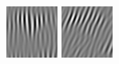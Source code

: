 \begin{figure}[ht]
\begin{center}
  \includegraphics[width=\columnwidth/9]{ch4/figures/real_1_0.jpg}
  \includegraphics[width=\columnwidth/9]{ch4/figures/real_1_1.jpg}

\end{center}
\end{figure}
